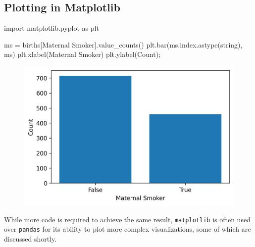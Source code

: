 \documentclass[
  letterpaper,
  DIV=11,
  numbers=noendperiod]{scrreprt}
\newenvironment{Shaded}{\begin{snugshade}}{\end{snugshade}}
\newcommand{\ImportTok}[1]{\textcolor[rgb]{0.00,0.46,0.62}{#1}}
\newcommand{\NormalTok}[1]{\textcolor[rgb]{0.00,0.23,0.31}{#1}}
\newcommand{\OperatorTok}[1]{\textcolor[rgb]{0.37,0.37,0.37}{#1}}
\newcommand{\StringTok}[1]{\textcolor[rgb]{0.13,0.47,0.30}{#1}}
\begin{document}
\hypertarget{plotting-in-matplotlib}{%
\subsection{Plotting in Matplotlib}\label{plotting-in-matplotlib}}

\begin{Shaded}
\begin{Highlighting}[]
\ImportTok{import}\NormalTok{ matplotlib.pyplot }\ImportTok{as}\NormalTok{ plt}

\NormalTok{ms }\OperatorTok{=}\NormalTok{ births[}\StringTok{\textquotesingle{}Maternal Smoker\textquotesingle{}}\NormalTok{].value\_counts()}
\NormalTok{plt.bar(ms.index.astype(}\StringTok{\textquotesingle{}string\textquotesingle{}}\NormalTok{), ms)}
\NormalTok{plt.xlabel(}\StringTok{\textquotesingle{}Maternal Smoker\textquotesingle{}}\NormalTok{)}
\NormalTok{plt.ylabel(}\StringTok{\textquotesingle{}Count\textquotesingle{}}\NormalTok{)}\OperatorTok{;}
\end{Highlighting}
\end{Shaded}

\begin{figure}[H]

{\centering \includegraphics{visualization_1/visualization_1_files/figure-pdf/cell-4-output-1.png}

}

\end{figure}

While more code is required to achieve the same result,
\texttt{matplotlib} is often used over \texttt{pandas} for its ability
to plot more complex visualizations, some of which are discussed
shortly.
\end{document}
